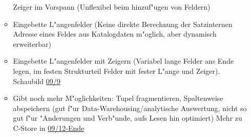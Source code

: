 \documentclass[a4paper, 12pt]{scrartcl}
\begin{document}
\begin{itemize}
\begin{itemize}
				Zeiger im Vorspann (Unflexibel beim hinzuf"ugen von Feldern)
			\item
				Eingebette L"angenfelder (Keine direkte Berechnung der Satzinternen Adresse eines Feldes aus Katalogdaten m"oglich, aber dynamisch erweiterbar)
			\item
				Eingebette L"angenfelder mit Zeigern (Variabel lange Felder ans Ende legen, im festen Strukturteil Felder mit fester L"ange und Zeiger). Schaubild \href{site:IDB-2015WS-09-Speicherung.pdf}{09/9}
			\item
				Gibt noch mehr M"oglichkeiten: Tupel fragmentieren, Spaltenweise abspeichern (gut f"ur Data-Warehousing/analytische Auswertung, nicht so gut f"ur "Anderungen und Verb"unde, aufs Lesen hin optimiert) Mehr zu C-Store in \href{site:IDB-2015WS-09-Speicherung.pdf}{09/12-Ende}
		\end{itemize}
\end{itemize}
\end{document}
